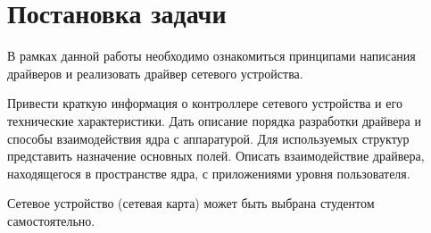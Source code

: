 \newpage
\section*{Постановка задачи}

\vspace{2em}

В рамках данной работы необходимо ознакомиться принципами написания драйверов и реализовать драйвер сетевого устройства.

\vspace{1em}

Привести краткую информация о контроллере сетевого устройства и его технические характеристики. Дать описание порядка разработки драйвера и способы взаимодействия ядра с аппаратурой. Для используемых структур представить назначение основных полей. Описать взаимодействие драйвера, находящегося в пространстве ядра, с приложениями уровня пользователя.

\vspace{1em}

Сетевое устройство (сетевая карта) может быть выбрана студентом самостоятельно.
